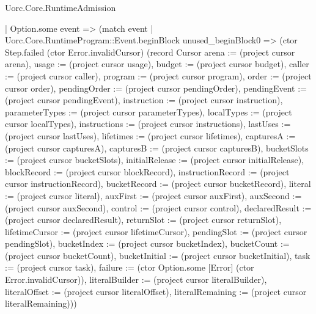 \begin{lexlean}{Uorc.Core.RuntimeAdmission}
\begin{semanticmodule}
{        | Option.some event => (match event
          | Uorc.Core.RuntimeProgram::Event.beginBlock unused_beginBlock0 => (ctor Step.failed (ctor Error.invalidCursor) (record Cursor {arena := (project cursor arena), usage := (project cursor usage), budget := (project cursor budget), caller := (project cursor caller), program := (project cursor program), order := (project cursor order), pendingOrder := (project cursor pendingOrder), pendingEvent := (project cursor pendingEvent), instruction := (project cursor instruction), parameterTypes := (project cursor parameterTypes), localTypes := (project cursor localTypes), instructions := (project cursor instructions), lastUses := (project cursor lastUses), lifetimes := (project cursor lifetimes), capturesA := (project cursor capturesA), capturesB := (project cursor capturesB), bucketSlots := (project cursor bucketSlots), initialRelease := (project cursor initialRelease), blockRecord := (project cursor blockRecord), instructionRecord := (project cursor instructionRecord), bucketRecord := (project cursor bucketRecord), literal := (project cursor literal), auxFirst := (project cursor auxFirst), auxSecond := (project cursor auxSecond), control := (project cursor control), declaredResult := (project cursor declaredResult), returnSlot := (project cursor returnSlot), lifetimeCursor := (project cursor lifetimeCursor), pendingSlot := (project cursor pendingSlot), bucketIndex := (project cursor bucketIndex), bucketCount := (project cursor bucketCount), bucketInitial := (project cursor bucketInitial), task := (project cursor task), failure := (ctor Option.some [Error] (ctor Error.invalidCursor)), literalBuilder := (project cursor literalBuilder), literalOffset := (project cursor literalOffset), literalRemaining := (project cursor literalRemaining)}))
}
\end{semanticmodule}
\end{lexlean}
